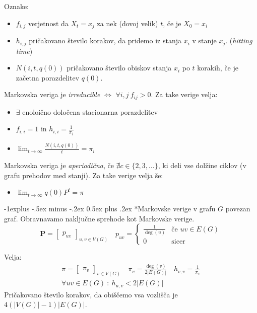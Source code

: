 \documentclass[a3paper,8pt]{extarticle}
\makeatletter
\renewcommand{\subsection}{\@startsection{subsection}{2}{0mm}%
                                {-1explus -.5ex minus -.2ex}%
                                {0.5ex plus .2ex}%
                                {\normalfont\normalsize\bfseries}}
\makeatother
\begin{document}
\begin{multicols}{4}
Oznake:
\begin{itemize}
    \item $f_{i,j}$ verjetnost da $X_t = x_j$ za nek (dovoj velik) $t$, če je $X_0 = x_i$
    \item $h_{i,j}$ pričakovano število korakov, da pridemo iz stanja $x_i$ v stanje $x_j$. (\textit{hitting time})
    \item $N(i, t, q(0))$ pričakovano število obiskov stanja $x_i$ po $t$ korakih, če je začetna porazdelitev $q(0)$.
\end{itemize}

Markovska veriga je \textit{irreducible} $\iff$ $\forall i, j \ f_{ij} > 0$. Za take verige velja:
\begin{itemize}
    \item $\exists$ enoloično določena stacionarna porazdelitev
    \item $f_{i,i} = 1$ in $h_{i,i} = \frac{1}{\pi_i}$
    \item $\lim_{t \to \infty} \frac{N(i, t, q(0))}{t} = \pi_i$
\end{itemize}

Markovska veriga je \textit{aperiodična}, če $\nexists c \in \{2, 3, \dots\}$, ki deli vse dolžine ciklov (v grafu prehodov med stanji). Za take verige velja še:
\begin{itemize}
    \item $\lim_{t \to \infty} q(0)P^t = \pi$
\end{itemize}


\subsection*{Markovske verige v grafu}
$G$ povezan graf. Obravnavamo naključne sprehode kot Markovske verige.
\[ \mathbf{P} = \begin{bmatrix}
    p_{uv}
\end{bmatrix}_{u,v \in V(G)} \quad 
    p_{uv} = \begin{cases}
    \frac{1}{\deg(u)} & \text{če } uv \in E(G) \\
    0 & \text{sicer}
\end{cases}\]

Velja:
\begin{gather*}
    \pi = \begin{bmatrix}
        \pi_v
    \end{bmatrix}_{v \in V(G)} \quad
    \pi_v = \frac{\deg(v)}{2|E(G)|}  \quad
    h_{v,v} = \frac{1}{\pi_v} \\
    \forall uv \in E(G)\ :\ h_{u,v} < 2|E(G)|
\end{gather*}
Pričakovano število korakov, da obiščemo vsa vozlišča je $4(|V(G)|-1)|E(G)|$.






\end{multicols}



\end{document}
